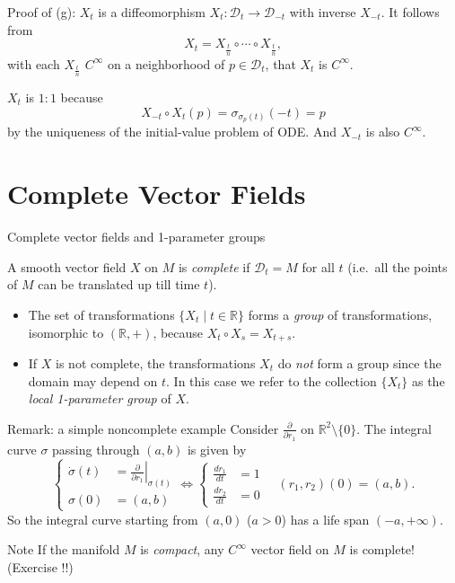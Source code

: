 \documentclass[10pt]{beamer}
\newcommand{\R}{\mathbb{R}}
\newcommand{\D}{\mathcal{D}}
\begin{document}
\begin{frame}{Proof of (g): $X_t$ is a diffeomorphism}
	$X_t : \D_t \longrightarrow \D_{-t}$ with inverse $X_{-t}$. It
	follows from
	\[
		X_t = X_{\frac{t}{n}} \circ \cdots \circ X_{\frac{t}{n}},
	\]
	with each $X_{\frac{t}{n}}$ $C^\infty$ on a neighborhood of
	$p \in \D_t$, that $X_t$ is $C^\infty$.
	\medskip

	$X_t$ is $1{:}1$ because
	\[
		X_{-t} \circ X_t(p) = \sigma_{\sigma_p(t)}(-t) = p
	\]
	by the uniqueness of the initial-value problem of ODE. And
	$X_{-t}$ is also $C^\infty$.
\end{frame}

\section{Complete Vector Fields}

\begin{frame}{Complete vector fields and 1-parameter groups}
	\begin{definition}
		A smooth vector field $X$ on $M$ is \emph{complete} if
		$\D_t = M$ for all $t$ (i.e.\ all the points of $M$ can be
		translated up till time $t$).
	\end{definition}
	\begin{itemize}
		\item The set of transformations $\{ X_t \mid t \in \R \}$
		      forms a \emph{group} of transformations, isomorphic to
		      $(\R, +)$, because $X_t \circ X_s = X_{t+s}$.
		\item If $X$ is not complete, the transformations $X_t$ do
		      \emph{not} form a group since the domain may depend on
		      $t$. In this case we refer to the collection
		      $\{ X_t \}$ as the \emph{local 1-parameter group}
		      of $X$.
	\end{itemize}
\end{frame}

\begin{frame}{Remark: a simple noncomplete example}
	Consider $\frac{\partial}{\partial r_1}$ on $\R^2 \setminus \{0\}$.
	The integral curve $\sigma$ passing through $(a, b)$ is given by
	\[
		\left\{
		\begin{aligned}
			\dot{\sigma}(t)
			 & = \left. \frac{\partial}{\partial r_1}
			\right|_{\sigma(t)} \\
			\sigma(0)          & = (a, b)
		\end{aligned}
		\right.
		\iff
		\left\{
		\begin{aligned}
			\frac{d r_1}{dt} & = 1 \\
			\frac{d r_2}{dt} & = 0
		\end{aligned}
		\right.
		\quad (r_1, r_2)(0) = (a, b).
	\]
	So the integral curve starting from $(a, 0)$ ($a > 0$) has a life
	span $(-a, +\infty)$.
	\medskip

	\begin{block}{Note}
		If the manifold $M$ is \emph{compact}, any $C^\infty$ vector
		field on $M$ is complete! (Exercise !!)
	\end{block}
\end{frame}
\end{document}

